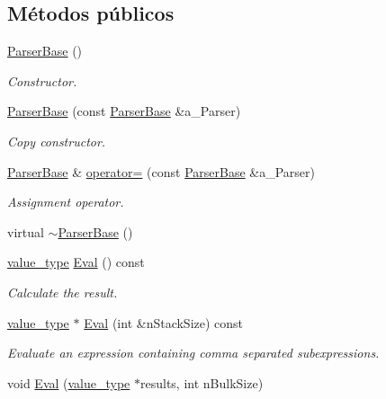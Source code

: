 \subsection*{Métodos públicos}
\begin{DoxyCompactItemize}
\item 
\hyperlink{classmu_1_1_parser_base_a41d13be909945b892777ee6773fa1f69}{Parser\+Base} ()
\begin{DoxyCompactList}\small\item\em Constructor. \end{DoxyCompactList}\item 
\hyperlink{classmu_1_1_parser_base_a88d9367e1a71bc07fe587633060223a0}{Parser\+Base} (const \hyperlink{classmu_1_1_parser_base}{Parser\+Base} \&a\+\_\+\+Parser)
\begin{DoxyCompactList}\small\item\em Copy constructor. \end{DoxyCompactList}\item 
\hyperlink{classmu_1_1_parser_base}{Parser\+Base} \& \hyperlink{classmu_1_1_parser_base_aca7cf1ea7f82dfb3066ada8427295a4c}{operator=} (const \hyperlink{classmu_1_1_parser_base}{Parser\+Base} \&a\+\_\+\+Parser)
\begin{DoxyCompactList}\small\item\em Assignment operator. \end{DoxyCompactList}\item 
virtual \hyperlink{classmu_1_1_parser_base_a94ec173a26a5ffc96325287830a44caa}{$\sim$\+Parser\+Base} ()
\item 
\hyperlink{namespacemu_a17d4f113a4b88b8d971cca8ddbbe8a47}{value\+\_\+type} \hyperlink{classmu_1_1_parser_base_a9f91f5d3c0acd2e30225eb97867dc651}{Eval} () const 
\begin{DoxyCompactList}\small\item\em Calculate the result. \end{DoxyCompactList}\item 
\hyperlink{namespacemu_a17d4f113a4b88b8d971cca8ddbbe8a47}{value\+\_\+type} $\ast$ \hyperlink{classmu_1_1_parser_base_a7d594b0e4c7b2540948357f0b2e31d98}{Eval} (int \&n\+Stack\+Size) const 
\begin{DoxyCompactList}\small\item\em Evaluate an expression containing comma separated subexpressions. \end{DoxyCompactList}\item 
void \hyperlink{classmu_1_1_parser_base_a70748ac6fc87f2821b356e79ec4a81eb}{Eval} (\hyperlink{namespacemu_a17d4f113a4b88b8d971cca8ddbbe8a47}{value\+\_\+type} $\ast$results, int n\+Bulk\+Size)

\end{DoxyCompactItemize}
